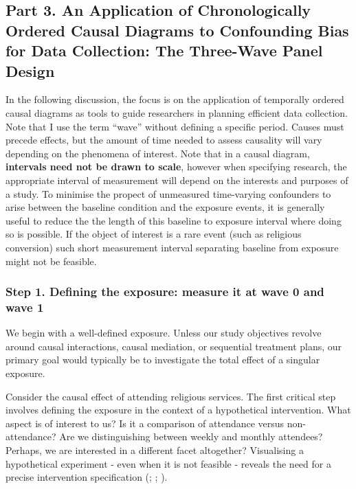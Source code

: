 \documentclass[
  singlecolumn]{article}
\begin{document}
\subsection{Part 3. An Application of Chronologically Ordered Causal
Diagrams to Confounding Bias for Data Collection: The Three-Wave Panel
Design}\label{part-3.-an-application-of-chronologically-ordered-causal-diagrams-to-confounding-bias-for-data-collection-the-three-wave-panel-design}

In the following discussion, the focus is on the application of
temporally ordered causal diagrams as tools to guide researchers in
planning efficient data collection. Note that I use the term ``wave''
without defining a specific period. Causes must precede effects, but the
amount of time needed to assess causality will vary depending on the
phenomena of interest. Note that in a causal diagram, \textbf{intervals
need not be drawn to scale}, however when specifying research, the
appropriate interval of measurement will depend on the interests and
purposes of a study. To minimise the propect of unmeasured time-varying
confounders to arise between the baseline condition and the exposure
events, it is generally useful to reduce the the length of this baseline
to exposure interval where doing so is possible. If the object of
interest is a rare event (such as religious conversion) such short
measurement interval separating baseline from exposure might not be
feasible.

\subsubsection{Step 1. Defining the exposure: measure it at wave 0 and
wave
1}\label{step-1.-defining-the-exposure-measure-it-at-wave-0-and-wave-1}

We begin with a well-defined exposure. Unless our study objectives
revolve around causal interactions, causal mediation, or sequential
treatment plans, our primary goal would typically be to investigate the
total effect of a singular exposure.

Consider the causal effect of attending religious services. The first
critical step involves defining the exposure in the context of a
hypothetical intervention. What aspect is of interest to us? Is it a
comparison of attendance versus non-attendance? Are we distinguishing
between weekly and monthly attendees? Perhaps, we are interested in a
different facet altogether? Visualising a hypothetical experiment - even
when it is not feasible - reveals the need for a precise intervention
specification (;
;
).
\end{document}
